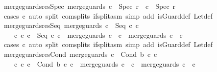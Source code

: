\begin{isabellebody}
\endisatagproof
{\isafoldproof}%
%
\isadelimproof
\isanewline
%
\endisadelimproof
\isanewline
{}\isamarkupfalse%
\ merge{\isacharunderscore}guards{\isacharunderscore}res{\isacharunderscore}Spec{\isacharcolon}\ {\isachardoublequoteopen}merge{\isacharunderscore}guards\ c\ {\isacharequal}\ Spec\ r\ {\isasymLongrightarrow}\ c\ {\isacharequal}\ Spec\ r{\isachardoublequoteclose}\isanewline
%
\isadelimproof
\ \ %
\endisadelimproof
%
\isatagproof
{}\isamarkupfalse%
\ {\isacharparenleft}cases\ c{\isacharparenright}\ {\isacharparenleft}auto\ split{\isacharcolon}\ com{\isachardot}splits\ if{\isacharunderscore}split{\isacharunderscore}asm\ simp\ add{\isacharcolon}\ is{\isacharunderscore}Guard{\isacharunderscore}def\ Let{\isacharunderscore}def{\isacharparenright}%
\endisatagproof
{\isafoldproof}%
%
\isadelimproof
\isanewline
%
\endisadelimproof
\isanewline
{}\isamarkupfalse%
\ merge{\isacharunderscore}guards{\isacharunderscore}res{\isacharunderscore}Seq{\isacharcolon}\ {\isachardoublequoteopen}merge{\isacharunderscore}guards\ c\ {\isacharequal}\ Seq\ c{}\ c{}\ {\isasymLongrightarrow}\ \isanewline
\ \ \ \ {\isasymexists}c{}{\isacharprime}\ c{}{\isacharprime}{\isachardot}\ c\ {\isacharequal}\ Seq\ c{}{\isacharprime}\ c{}{\isacharprime}\ {\isasymand}\ merge{\isacharunderscore}guards\ c{}{\isacharprime}\ {\isacharequal}\ c{}\ {\isasymand}\ merge{\isacharunderscore}guards\ c{}{\isacharprime}\ {\isacharequal}\ c{}{\isachardoublequoteclose}\isanewline
%
\isadelimproof
\ \ %
\endisadelimproof
%
\isatagproof
{}\isamarkupfalse%
\ {\isacharparenleft}cases\ c{\isacharparenright}\ {\isacharparenleft}auto\ split{\isacharcolon}\ com{\isachardot}splits\ if{\isacharunderscore}split{\isacharunderscore}asm\ simp\ add{\isacharcolon}\ is{\isacharunderscore}Guard{\isacharunderscore}def\ Let{\isacharunderscore}def{\isacharparenright}%
\endisatagproof
{\isafoldproof}%
%
\isadelimproof
\isanewline
%
\endisadelimproof
\isanewline
{}\isamarkupfalse%
\ merge{\isacharunderscore}guards{\isacharunderscore}res{\isacharunderscore}Cond{\isacharcolon}\ {\isachardoublequoteopen}merge{\isacharunderscore}guards\ c\ {\isacharequal}\ Cond\ b\ c{}\ c{}\ {\isasymLongrightarrow}\ \isanewline
\ \ \ \ {\isasymexists}c{}{\isacharprime}\ c{}{\isacharprime}{\isachardot}\ c\ {\isacharequal}\ Cond\ b\ c{}{\isacharprime}\ c{}{\isacharprime}\ {\isasymand}\ merge{\isacharunderscore}guards\ c{}{\isacharprime}\ {\isacharequal}\ c{}\ {\isasymand}\ merge{\isacharunderscore}guards\ c{}{\isacharprime}\ {\isacharequal}\ c{}{\isachardoublequoteclose}\isanewline

\end{isabellebody}

